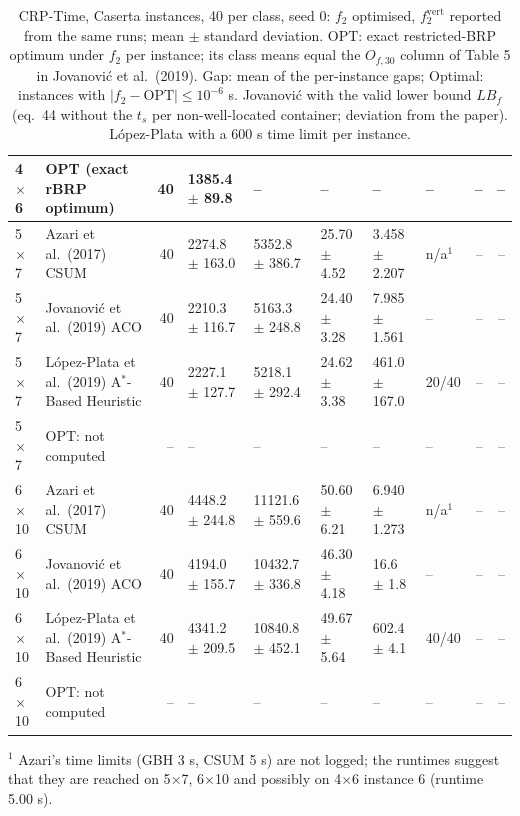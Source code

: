 \begin{table}[htbp]
\begin{tabular}{llrlllllrr}
4$\times$6 & OPT (exact rBRP optimum) & 40 & 1385.4 $\pm$ 89.8 & -- & -- & -- & -- & -- & -- \\
\midrule
5$\times$7 & Azari et al.\ (2017) CSUM & 40 & 2274.8 $\pm$ 163.0 & 5352.8 $\pm$ 386.7 & 25.70 $\pm$ 4.52 & 3.458 $\pm$ 2.207 & n/a$^{1}$ & -- & -- \\
5$\times$7 & Jovanovi\'{c} et al.\ (2019) ACO & 40 & 2210.3 $\pm$ 116.7 & 5163.3 $\pm$ 248.8 & 24.40 $\pm$ 3.28 & 7.985 $\pm$ 1.561 & -- & -- & -- \\
5$\times$7 & L\'{o}pez-Plata et al.\ (2019) A$^\ast$-Based Heuristic & 40 & 2227.1 $\pm$ 127.7 & 5218.1 $\pm$ 292.4 & 24.62 $\pm$ 3.38 & 461.0 $\pm$ 167.0 & 20/40 & -- & -- \\
5$\times$7 & OPT: not computed & -- & -- & -- & -- & -- & -- & -- & -- \\
\midrule
6$\times$10 & Azari et al.\ (2017) CSUM & 40 & 4448.2 $\pm$ 244.8 & 11121.6 $\pm$ 559.6 & 50.60 $\pm$ 6.21 & 6.940 $\pm$ 1.273 & n/a$^{1}$ & -- & -- \\
6$\times$10 & Jovanovi\'{c} et al.\ (2019) ACO & 40 & 4194.0 $\pm$ 155.7 & 10432.7 $\pm$ 336.8 & 46.30 $\pm$ 4.18 & 16.6 $\pm$ 1.8 & -- & -- & -- \\
6$\times$10 & L\'{o}pez-Plata et al.\ (2019) A$^\ast$-Based Heuristic & 40 & 4341.2 $\pm$ 209.5 & 10840.8 $\pm$ 452.1 & 49.67 $\pm$ 5.64 & 602.4 $\pm$ 4.1 & 40/40 & -- & -- \\
6$\times$10 & OPT: not computed & -- & -- & -- & -- & -- & -- & -- & -- \\
\bottomrule
\end{tabular}
\par\smallskip\footnotesize $^{1}$ Azari's time limits (GBH 3 s, CSUM 5 s) are not logged; the runtimes suggest that they are reached on 5$\times$7, 6$\times$10 and possibly on 4$\times$6 instance 6 (runtime 5.00 s).
\caption{CRP-Time, Caserta instances, 40 per class, seed 0: $f_2$ optimised, $f_2^{\mathrm{vert}}$ reported from the same runs; mean $\pm$ standard deviation. OPT: exact restricted-BRP optimum under $f_2$ per instance; its class means equal the $O_{f,30}$ column of Table 5 in Jovanovi\'{c} et al.\ (2019). Gap: mean of the per-instance gaps; Optimal: instances with $|f_2 - \mathrm{OPT}| \le 10^{-6}$ s. Jovanovi\'{c} with the valid lower bound $LB_f$ (eq.~44 without the $t_s$ per non-well-located container; deviation from the paper). L\'{o}pez-Plata with a 600 s time limit per instance.}
\label{tab:crp-time-f2-comparison}
\end{table}


